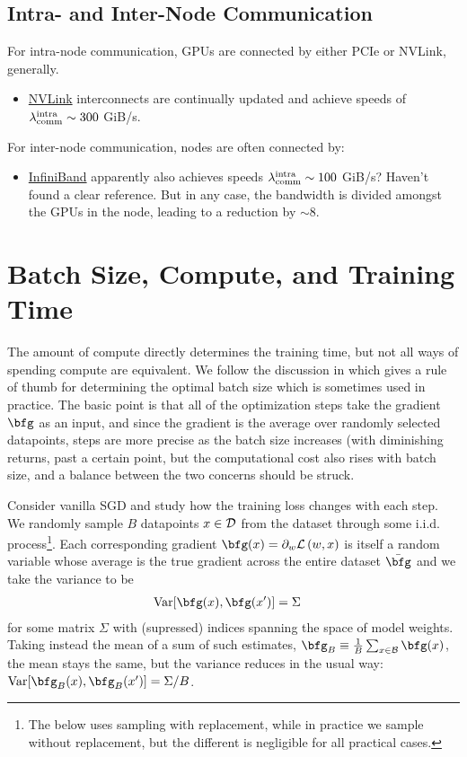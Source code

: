 \subsection{Intra- and Inter-Node Communication}

For intra-node communication, GPUs are connected by either PCIe or NVLink, generally.
\begin{itemize}
	\item \href{https://blogs.nvidia.com/blog/2023/03/06/what-is-nvidia-nvlink/}{NVLink}
	      interconnects are continually updated and achieve speeds of $ \lambda _{ {\rm comm} } ^{
			      {\rm intra} } \sim 300$ GiB/s.
\end{itemize}


For inter-node communication, nodes are often connected by:
\begin{itemize}
	\item \href{https://en.wikipedia.org/wiki/InfiniBand}{InfiniBand} apparently also achieves speeds $ \lambda _{ {\rm comm} } ^{
			      {\rm intra} } \sim 100$ GiB/s?  Haven't found a clear reference. But in any case, the
	      bandwidth is divided amongst the GPUs in the node, leading to a reduction by $ \sim 8 $.
\end{itemize}

\section{Batch Size, Compute, and Training Time \label{app_batch_size}}

The amount of compute directly determines the training time, but not all ways of spending compute
are equivalent. We follow the discussion in \cite{mccandlish2018empirical} which gives a rule of thumb
for determining the optimal batch size which is sometimes used in practice. The basic point is that
all of the optimization steps take the gradient $ \bfg  $ as an input, and since the gradient is the
average over randomly selected datapoints, steps are more precise as the batch size increases (with
diminishing returns, past a certain point, but the computational cost also rises with batch size,
and a balance between the two concerns should be struck.

Consider vanilla SGD and study how the training loss changes with each step.  We randomly sample $ B
$ datapoints $ x \in \mathcal{D}$ from the dataset through some i.i.d. process\footnote{The below uses
	sampling with replacement, while in practice we sample without replacement, but the different is
	negligible for all practical cases.}. Each corresponding gradient $ \bfg (x) = \partial _{ w} \Lcal
	\left ( w, x \right ) $ is itself a random variable whose average is the true gradient across the
entire dataset $ \bar{\bfg} $ and we take the variance to be
\begin{align}
	{\rm Var}[\bfg (x), \bfg (x')] & =\Sigma
\end{align}
for some matrix $ \Sigma  $ with (supressed) indices spanning the space of model weights. Taking instead the mean
of a sum of such estimates, $ \bfg _{ B }\equiv \frac{ 1 }{ B } \sum _{ x \in \Bcal} \bfg (x) $,
the mean stays the same, but the variance reduces in the usual way: $ {\rm Var}[\bfg _{ B } (x),
			\bfg _{ B }(x')]=\Sigma /B$.

